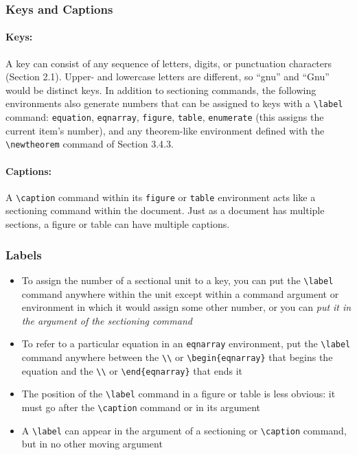 \documentclass{article}
\newcommand{\justtext}[1]{\texttt{\textbackslash #1}}
\begin{document}
\subsubsection{Keys and Captions}

\paragraph{Keys:} A key can consist of any sequence of letters, digits, or punctuation characters
 (Section 2.1). Upper- and lowercase letters are different, so ``gnu'' and ``Gnu'' would be
 distinct keys. In addition to sectioning commands, the following environments also generate
 numbers that can be assigned to keys with a \justtext{label} command: 
 {\tt equation}, 
 {\tt eqnarray},
 {\tt figure}, 
 {\tt table}, 
 {\tt enumerate} (this assigns the current item's number), 
 and any theorem-like environment defined with the \justtext{newtheorem} command of Section 3.4.3.

\paragraph{Captions:} A \justtext{caption} command within its {\tt figure} or {\tt table}
 environment acts like a sectioning command within the document. Just as a document has multiple
 sections, a figure or table can have multiple captions.

\subsubsection{Labels}

\begin{itemize}
   
   \item To assign the number of a sectional unit to a key, you can put the \justtext{label} command
    anywhere within the unit except within a command argument or environment in which it would
    assign some other number, or you can \emph{put it in the argument of the sectioning command}

   \item To refer to a particular equation in an {\tt eqnarray} environment, put the 
    \justtext{label} command anywhere between the \justtext{\textbackslash} or 
    \justtext{begin\{eqnarray\}} that begins the equation and the \justtext{\textbackslash} or 
    \justtext{end\{eqnarray\}} that ends it

   \item The position of the \justtext{label} command in a figure or table is less obvious: it must
    go after the \justtext{caption} command or in its argument
    
   \item A \justtext{label} can appear in the argument of a sectioning or \justtext{caption} 
    command, but in no other moving argument

\end{itemize}
\end{document}
